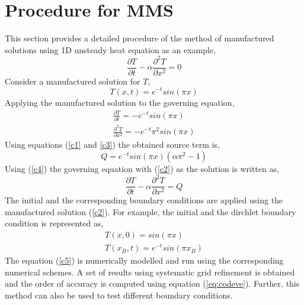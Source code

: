 \chapter{Procedure for MMS}
\label{app=mms}
This section provides a detailed procedure of the method of manufactured solutions using 1D unsteady heat equation as an example,
\begin{equation}\label{c1}
    \frac{\partial T}{\partial t}-\alpha\frac{\partial^2 T}{\partial x^2}=0
\end{equation}
Consider a manufactured solution for $T$,
\begin{equation}\label{c2}
    T(x,t)=e^{-t} sin(\pi x)
\end{equation}
Applying the manufactured solution to the governing equation,
\begin{equation}\label{c3}
\begin{gathered}
    \frac{\partial T}{\partial t}=-e^{-t} sin(\pi x)\\
    \frac{\partial^2 T}{\partial x^2}=-e^{-t} \pi^2 sin(\pi x)
\end{gathered}
\end{equation}
Using equations (\ref{c1} and \ref{c3}) the obtained source term is,
\begin{equation}\label{c4}
Q=e^{-t}sin(\pi x) (\alpha \pi^2-1)
\end{equation}
Using (\ref{c4}) the governing equation with (\ref{c2}) as the solution is written as,
\begin{equation}\label{c5}
\frac{\partial T}{\partial t}-\alpha\frac{\partial^2 T}{\partial x^2}=Q
\end{equation}
The initial and the corresponding boundary conditions are applied using the manufactured solution (\ref{c2}). For example, the initial and the dirchlet boundary condition is represented as,
\begin{equation}
\begin{gathered}
    T(x,0)=sin(\pi x)\\
    T(x_B,t)=e^{-t}sin(\pi x_B)
\end{gathered}
\end{equation}
The equation (\ref{c5}) is numerically modelled and run using the corresponding numerical schemes. A set of results using systematic grid refinement is obtained and the order of accuracy is computed using equation (\ref{eq:codeve}). Further, this method can also be used to test different boundary conditions.
    